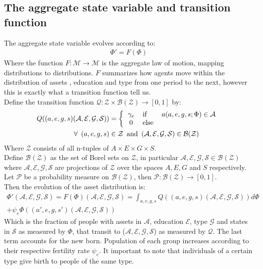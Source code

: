  \subsection*{The aggregate state variable and transition function}
\noindent The aggregate state variable evolves according to:
\begin{align}
\Phi'=F(\Phi)
\end{align}
Where the function $F:\mathcal{M}\to\mathcal{M}$ is the aggregate law of motion, mapping distributions to distributions. $F$ summarizes how agents move within the distribution of assets , education and type from one period to the next, however this is exactly what a transition function tell us. \\
\noindent Define the transition function $\mathcal{Q}:\mathcal{Z}\times\mathcal{B(Z)}\to[0,1]$ by:
\begin{align*}
Q((a,e,g,s)(\mathcal{A},\mathcal{E},\mathcal{G},\mathcal{S})) &= \left\{
\begin{tabular}{clc}
$\gamma_{e}$ & if      & $a(a,e,g,s;\Phi) \in \mathcal{A} $\\
0 & else &
\end{tabular}
\right.\\
\forall \,\,\,(a,e,g,s)&\in\mathcal{Z}\,\,\,\mbox{and}\,\,\,(\mathcal{A,E,G,S})\in{\mathcal{B(Z)}}
\end{align*}
Where $\mathcal{Z}$ consists of all n-tuples of $A\times E\times G\times S$. \\
Define $\mathcal{B(Z)}$ as the set of Borel sets on $\mathcal{Z}$, in particular $\mathcal{A,E,G,S}\in\mathcal{B(Z)}$ where $\mathcal{A,E,G,S}$ are projections of $\mathcal{Z}$ over the spaces $A,E,G$ and $S$ respectively. Let $\mathcal{P}$ be a probability measure on $\mathcal{B(Z)}$, then $\mathcal{P}: \mathcal{B(Z)}\to[0,1]$.\\
Then the evolution of the asset distribution is:
\begin{align}
\Phi'(\mathcal{A,E,G,S}) = F(\Phi) (\mathcal{A,E,G,S})= \int_{a,e,g,s} Q((a,e,g,s)(\mathcal{A,E,G,S})) d \Phi\\+\psi_{e}\Phi((a',e,g,s')(\mathcal{A,E,G,S}))
\end{align}
Which is the fraction of people with assets in $\mathcal{A}$, education $\mathcal{E}$, type $\mathcal{G}$ and states in $\mathcal{S}$ as measured by $\Phi$, that transit to ($\mathcal{A,E,G,S}$) as measured by $\mathcal{Q}$. The last term accounts for the new born. Population of each group increases according to their respective fertility rate $\psi_{e}$. It important to note that individuals of a certain type give birth to people of the same type.
